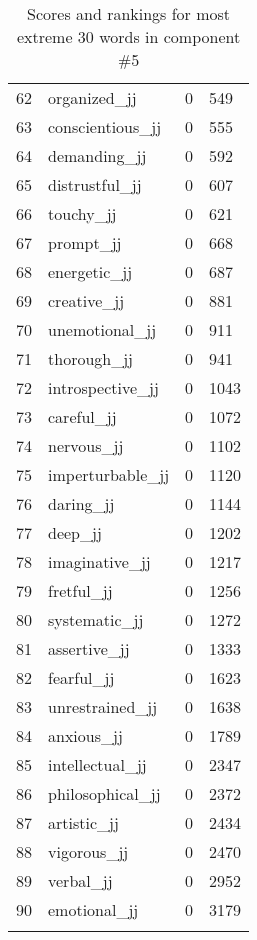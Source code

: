 \begin{longtable}[!htbp]{| rlr@{.}l |}
    62 & organized\_jj & 0 & 549 \\
    63 & conscientious\_jj & 0 & 555 \\
    64 & demanding\_jj & 0 & 592 \\
    65 & distrustful\_jj & 0 & 607 \\
    66 & touchy\_jj & 0 & 621 \\
    67 & prompt\_jj & 0 & 668 \\
    68 & energetic\_jj & 0 & 687 \\
    69 & creative\_jj & 0 & 881 \\
    70 & unemotional\_jj & 0 & 911 \\
    71 & thorough\_jj & 0 & 941 \\
    72 & introspective\_jj & 0 & 1043 \\
    73 & careful\_jj & 0 & 1072 \\
    74 & nervous\_jj & 0 & 1102 \\
    75 & imperturbable\_jj & 0 & 1120 \\
    76 & daring\_jj & 0 & 1144 \\
    77 & deep\_jj & 0 & 1202 \\
    78 & imaginative\_jj & 0 & 1217 \\
    79 & fretful\_jj & 0 & 1256 \\
    80 & systematic\_jj & 0 & 1272 \\
    81 & assertive\_jj & 0 & 1333 \\
    82 & fearful\_jj & 0 & 1623 \\
    83 & unrestrained\_jj & 0 & 1638 \\
    84 & anxious\_jj & 0 & 1789 \\
    85 & intellectual\_jj & 0 & 2347 \\
    86 & philosophical\_jj & 0 & 2372 \\
    87 & artistic\_jj & 0 & 2434 \\
    88 & vigorous\_jj & 0 & 2470 \\
    89 & verbal\_jj & 0 & 2952 \\
    90 & emotional\_jj & 0 & 3179 \\
    \hline
    \caption{Scores and rankings for most extreme 30 words in component \#5} \\
\end{longtable}

